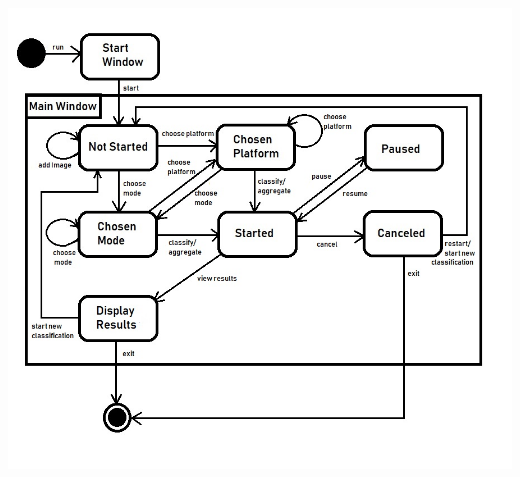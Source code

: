 \documentclass[parskip=full]{scrartcl}
\begin{document}
\begin{center}
\includegraphics[width=1.0\textwidth]{StateDiag.jpg}
\end{center}

\pagebreak
\end{document}
